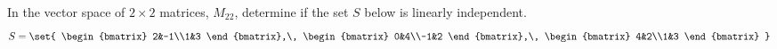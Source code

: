 In the vector space of $2\times 2$ matrices, $M_{22}$, determine if the set $S$ below is linearly independent.
%
\begin{equation*}
S=\set{
\begin{bmatrix}
2&-1\\1&3
\end{bmatrix},\,
%
\begin{bmatrix}
0&4\\-1&2
\end{bmatrix},\,
%
\begin{bmatrix}
4&2\\1&3
\end{bmatrix}
}
\end{equation*}
